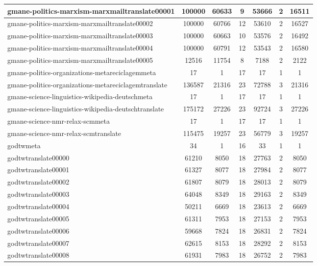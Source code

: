 \begin{table*}[h!]
\begin{center}
\begin{tabular}{| l | c | c | c | c | c | c |}
gmane-politics-marxism-marxmailtranslate00001 & 100000  & 60633  & 9  & 53666  & 2  & 16511 \\\hline
gmane-politics-marxism-marxmailtranslate00002 & 100000  & 60766  & 12  & 53610  & 2  & 16527 \\\hline
gmane-politics-marxism-marxmailtranslate00003 & 100000  & 60663  & 10  & 53576  & 2  & 16492 \\\hline
gmane-politics-marxism-marxmailtranslate00004 & 100000  & 60791  & 12  & 53543  & 2  & 16580 \\\hline
gmane-politics-marxism-marxmailtranslate00005 & 12516  & 11754  & 8  & 7188  & 2  & 2122 \\\hline
gmane-politics-organizations-metareciclagemmeta & 17  & 1  & 17  & 17  & 1  & 1 \\\hline
gmane-politics-organizations-metareciclagemtranslate & 136587  & 21316  & 23  & 72788  & 3  & 21316 \\\hline
gmane-science-linguistics-wikipedia-deutschmeta & 17  & 1  & 17  & 17  & 1  & 1 \\\hline
gmane-science-linguistics-wikipedia-deutschtranslate & 175172  & 27226  & 23  & 92724  & 3  & 27226 \\\hline
gmane-science-nmr-relax-scmmeta & 17  & 1  & 17  & 17  & 1  & 1 \\\hline
gmane-science-nmr-relax-scmtranslate & 115475  & 19257  & 23  & 56779  & 3  & 19257 \\\hline
godtwmeta & 34  & 1  & 16  & 33  & 1  & 1 \\\hline
godtwtranslate00000 & 61210  & 8050  & 18  & 27763  & 2  & 8050 \\\hline
godtwtranslate00001 & 61327  & 8077  & 18  & 27984  & 2  & 8077 \\\hline
godtwtranslate00002 & 61807  & 8079  & 18  & 28013  & 2  & 8079 \\\hline
godtwtranslate00003 & 64048  & 8349  & 18  & 29163  & 2  & 8349 \\\hline
godtwtranslate00004 & 50211  & 6669  & 18  & 23613  & 2  & 6669 \\\hline
godtwtranslate00005 & 61311  & 7953  & 18  & 27153  & 2  & 7953 \\\hline
godtwtranslate00006 & 59668  & 7824  & 18  & 26831  & 2  & 7824 \\\hline
godtwtranslate00007 & 62615  & 8153  & 18  & 28292  & 2  & 8153 \\\hline
godtwtranslate00008 & 61931  & 7983  & 18  & 26752  & 2  & 7983 \\\hline

\end{tabular}
\end{center}
\end{table*}
